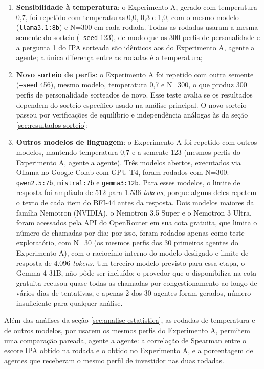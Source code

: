 \begin{enumerate}
    \item \textbf{Sensibilidade à temperatura}: o Experimento A, gerado com
    temperatura 0,7, foi repetido com temperaturas 0,0, 0,3 e 1,0, com o
    mesmo modelo (\texttt{llama3.1:8b}) e N=300 em cada rodada. Todas as
    rodadas usaram a mesma semente do sorteio (\texttt{--seed} 123), de
    modo que os 300 perfis de personalidade e a pergunta 1 do IPA sorteada
    são idênticos aos do Experimento A, agente a agente; a única diferença
    entre as rodadas é a temperatura;
    \item \textbf{Novo sorteio de perfis}: o Experimento A foi repetido com
    outra semente (\texttt{--seed} 456), mesmo modelo, temperatura 0,7 e
    N=300, o que produz 300 perfis de personalidade sorteados de novo. Esse
    teste avalia se os resultados dependem do sorteio específico usado na
    análise principal. O novo sorteio passou por verificações de
    equilíbrio e independência análogas às da seção
    \ref{sec:resultados-sorteio};
    \item \textbf{Outros modelos de linguagem}: o Experimento A foi
    repetido com outros modelos, mantendo temperatura 0,7 e a semente 123
    (mesmos perfis do Experimento A, agente a agente). Três modelos
    abertos, executados via Ollama no Google Colab com GPU T4, foram
    rodados com N=300: \texttt{qwen2.5:7b}, \texttt{mistral:7b} e
    \texttt{gemma3:12b}. Para esses modelos, o limite de resposta foi
    ampliado de 512 para 1.536 \textit{tokens}, porque alguns deles
    repetem o texto de cada item do BFI-44 antes da resposta. Dois modelos
    maiores da família Nemotron (NVIDIA), o Nemotron 3.5 Super e o
    Nemotron 3 Ultra, foram acessados pela API do OpenRouter em sua cota
    gratuita, que limita o número de chamadas por dia; por isso, foram
    rodados apenas como teste exploratório, com N=30 (os mesmos perfis dos
    30 primeiros agentes do Experimento A), com o raciocínio interno do
    modelo desligado e limite de resposta de 4.096 \textit{tokens}. Um terceiro
    modelo previsto para essa etapa, o Gemma 4 31B, não pôde ser incluído:
    o provedor que o disponibiliza na cota gratuita recusou quase todas as
    chamadas por congestionamento ao longo de vários dias de tentativas,
    e apenas 2 dos 30 agentes foram gerados, número insuficiente para
    qualquer análise.
\end{enumerate}

Além das análises da seção \ref{sec:analise-estatistica}, as rodadas de
temperatura e de outros modelos, por usarem os mesmos perfis do
Experimento A, permitem uma comparação pareada, agente a agente: a correlação de Spearman entre o escore IPA obtido na
rodada e o obtido no Experimento A, e a porcentagem de agentes que
receberam o mesmo perfil de investidor nas duas rodadas.

